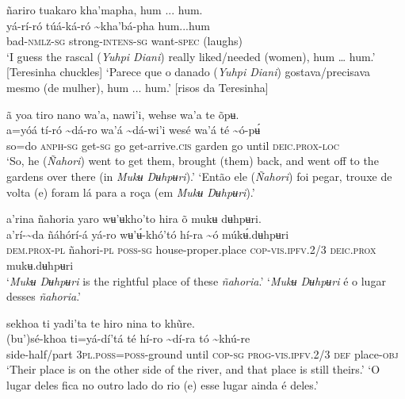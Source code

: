\documentclass[output=paper,
modfonts,nonflat
]{langsci/langscibook}
\begin{document}
\ea ñariro tuakaro kha'mapha, hum ... hum. \\[.3em]
\gll {\textasciitilde}yá-rí-ró	túá-ká-ró	{\textasciitilde}kha'bá-pha	hum...hum \\
     bad-\textsc{nmlz-sg}	strong-\textsc{intens-sg}	want-\textsc{spec}	(laughs)\\
\glt ‘I guess the rascal (\textit{Yuhpi Diani}) really liked/needed (women), hum … hum.’ [Teresinha chuckles]
\glt ‘Parece que o danado (\textit{Yuhpi Diani}) gostava/precisava mesmo (de mulher), hum ... hum.’ [risos da Teresinha]
\z 
 
\ea ã yoa tiro nano wa'a, nawi'i, wehse wa'a te õpʉ. \\[.3em]
\gll {\textasciitilde}a=yóá	tí-ró	{\textasciitilde}dá-ro	wa'á	{\textasciitilde}dá-wi'i	wesé	wa'á	té	{\textasciitilde}ó-pʉ́ \\
     so=do	\textsc{anph-sg}	get\textsc{-sg}	go	get-arrive\textsc{.cis}	garden	go	until 	\textsc{deic.prox-loc} \\
\glt ‘So, he (\textit{Ñahori}) went to get them, brought (them) back, and went off to the gardens over there (in \textit{Mukʉ Dʉhpʉri}).’
\glt ‘Então ele (\textit{Ñahori}) foi pegar, trouxe de volta (e) foram lá para a roça (em \textit{Mukʉ Dʉhpʉri}).’
\z 

\newpage 
\ea a’rina ñahoria yaro wʉ'ʉkho'to hira õ mukʉ dʉhpʉri.  \\[.3em]
\gll a’rí-{\textasciitilde}da	ñáhórí-á	yá-ro	wʉ'ʉ́-khó'tó	hí-ra	{\textasciitilde}ó	múkʉ́.dʉhpʉri \\
     \textsc{dem.prox-pl}	ñahori-\textsc{pl}	\textsc{poss-sg}	house-proper.place	\textsc{cop-vis.ipfv.}2/3	\textsc{deic.prox}	mukʉ.dʉhpʉri \\
\glt ‘\textit{Mukʉ Dʉhpʉri} is the rightful place of these \textit{ñahoria}.’ 
\glt ‘\textit{Mukʉ Dʉhpʉri} é o lugar desses \textit{ñahoria}.’ 
\z 

 
\ea sekhoa ti yadi'ta te hiro nina to khũre. \\[.3em]
\gll (bu')sé-khoa	ti=yá-dí'tá	té	hí-ro	{\textasciitilde}dí-ra	tó	{\textasciitilde}khú-re \\
     side-half/part	3\textsc{pl.poss=poss}-ground	until	\textsc{cop-sg}	\textsc{prog-vis.ipfv.}2/3	\textsc{def}	place\textsc{-obj} \\
\glt ‘Their place is on the other side of the river, and that place is still theirs.’
\glt ‘O lugar deles fica no outro lado do rio (e) esse lugar ainda é deles.’
\z 
\end{document}
